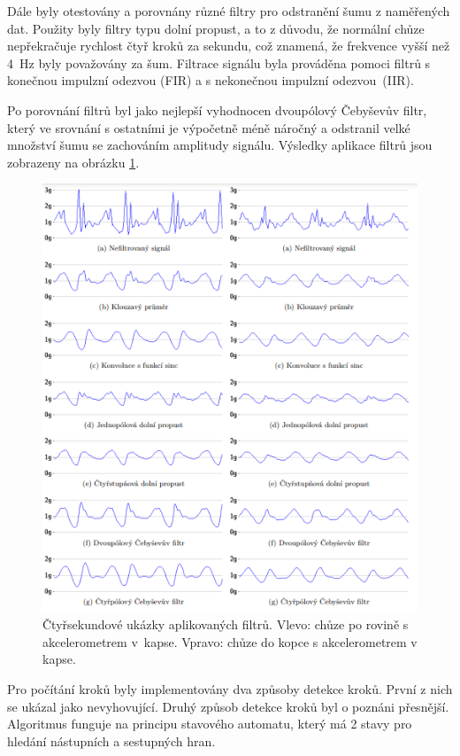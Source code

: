 Dále byly otestovány a porovnány různé filtry pro odstranění šumu z naměřených dat. Použity byly filtry typu dolní propust, a to z důvodu, že normální chůze nepřekračuje rychlost čtyř kroků za sekundu, což znamená, že frekvence vyšší než 4~Hz byly považovány za šum. Filtrace signálu byla prováděna pomoci filtrů s konečnou impulzní odezvou (FIR) a s nekonečnou impulzní odezvou~(IIR).

Po porovnání filtrů byl jako nejlepší vyhodnocen dvoupólový Čebyševův filtr, který ve srovnání s ostatními je výpočetně méně náročný a odstranil velké množství šumu se zachováním amplitudy signálu. Výsledky aplikace filtrů jsou zobrazeny na obrázku \ref{fig:filtr}.

\begin{figure}[!h]
	\centering
	\includegraphics[width = .865\linewidth]{Figures/Filtry.png}
	\captionsetup{justification = centering}
	\caption{Čtyřsekundové ukázky aplikovaných filtrů. Vlevo: chůze po rovině s akcelerometrem v~kapse. Vpravo: chůze do kopce s akcelerometrem v kapse.}
	\label{fig:filtr}
	\vspace{-15pt}
\end{figure}

Pro počítání kroků byly implementovány dva způsoby detekce kroků. První z nich se ukázal jako nevyhovující. Druhý způsob detekce kroků byl o poznáni přesnější. Algoritmus funguje na principu stavového automatu, který má 2 stavy pro hledání nástupních a sestupných hran.

